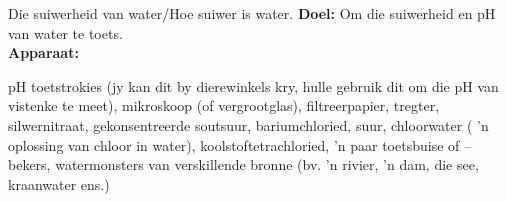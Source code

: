             \begin{g_experiment}{Die suiwerheid van water/Hoe suiwer is water.}
            \nopagebreak
            \label{m38138*id08341}\noindent{}\textbf{Doel:}\newline
Om die suiwerheid en pH van water te toets.
\\
\label{m38138*id083244}\noindent{}\textbf{Apparaat:}\\
\begin{minipage}{.5\textwidth}
pH toetstrokies (jy kan dit by dierewinkels kry, hulle gebruik dit om die pH van vistenke te meet), mikroskoop (of vergrootglas), filtreerpapier, tregter, silwernitraat, gekonsentreerde soutsuur, bariumchloried, suur, chloorwater (  'n oplossing van chloor in water), koolstoftetrachloried,   'n paar toetsbuise of –bekers, watermonsters van verskillende bronne (bv.   'n rivier,   'n dam, die see, kraanwater ens.)
\end{minipage}
\begin{minipage}{.5\textwidth}


\end{minipage}
\end{g_experiment}
